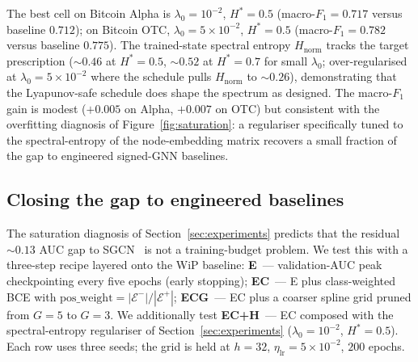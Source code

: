 The best cell on Bitcoin Alpha is
$\lambda_0\!=\!10^{-2}$, $H^*\!=\!0.5$ (macro-$F_1\!=\!0.717$
versus baseline $0.712$); on Bitcoin OTC,
$\lambda_0\!=\!5\!\times\!10^{-2}$, $H^*\!=\!0.5$
(macro-$F_1\!=\!0.782$ versus baseline $0.775$). The trained-state
spectral entropy $H_{\mathrm{norm}}$ tracks the target prescription
($\sim\!0.46$ at $H^*\!=\!0.5$, $\sim\!0.52$ at $H^*\!=\!0.7$ for
small $\lambda_0$; over-regularised at $\lambda_0\!=\!5\!\times\!10^{-2}$
where the schedule pulls $H_{\mathrm{norm}}$ to $\sim\!0.26$),
demonstrating that the Lyapunov-safe schedule does shape the
spectrum as designed. The macro-$F_1$ gain is modest
($+0.005$ on Alpha, $+0.007$ on OTC) but consistent with the
overfitting diagnosis of Figure~\ref{fig:saturation}: a
regulariser specifically tuned to the spectral-entropy of the
node-embedding matrix recovers a small fraction of the gap to
engineered signed-GNN baselines.

\subsection{Closing the gap to engineered baselines}
\label{sec:gap}

The saturation diagnosis of Section~\ref{sec:experiments} predicts
that the residual $\sim\!0.13$ AUC gap to
SGCN~\cite{derr2018sgcn} is not a training-budget problem. We test
this with a three-step recipe layered onto the WiP baseline:
\textbf{E}~--- validation-AUC peak checkpointing every five
epochs (early stopping); \textbf{EC}~--- E plus class-weighted
BCE with $\mathrm{pos\_weight} = |\mathcal{E}^-|/|\mathcal{E}^+|$;
\textbf{ECG}~--- EC plus a coarser spline grid pruned from
$G\!=\!5$ to $G\!=\!3$. We additionally test \textbf{EC+H}~---
EC composed with the spectral-entropy regulariser of
Section~\ref{sec:experiments} ($\lambda_0\!=\!10^{-2}$,
$H^*\!=\!0.5$). Each row uses three seeds; the grid is
held at $h\!=\!32$, $\eta_{\mathrm{lr}}\!=\!5\!\times\!10^{-2}$,
$200$ epochs.

\begin{table}[t]
\centering
\caption{Closing the AUC gap to SGCN. Median over three seeds at
$h\!=\!32$, $\eta_{\mathrm{lr}}\!=\!5\!\times\!10^{-2}$.
\textbf{W}: WiP baseline; \textbf{E}: + early stopping;
\textbf{EC}: + class-weighted BCE; \textbf{ECG}: + grid $G\!=\!3$.}
\label{tab:gap}
\setlength{\tabcolsep}{4pt}

\end{table}

